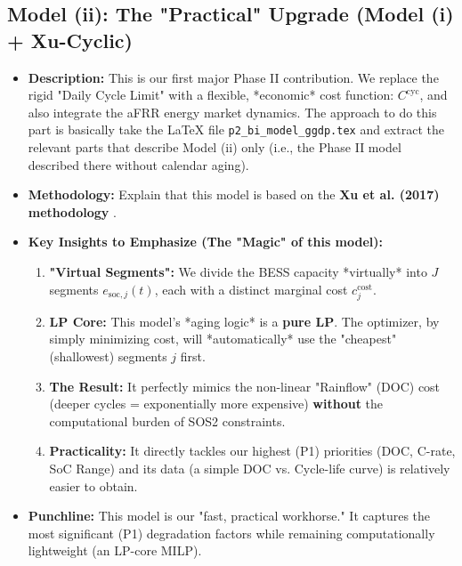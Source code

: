 \documentclass[11pt, a4paper]{article}
\begin{document}
\subsection{Model (ii): The "Practical" Upgrade (Model (i) + Xu-Cyclic)}
\begin{itemize}
    \item \textbf{Description:} This is our first major Phase II contribution. We replace the rigid "Daily Cycle Limit" with a flexible, *economic* cost function: $C^{\mathrm{cyc}}$, and also integrate the aFRR energy market dynamics. The approach to do this part is basically take the LaTeX file \texttt{p2\_bi\_model\_ggdp.tex} and extract the relevant parts that describe Model (ii) only (i.e., the Phase II model described there without calendar aging).
    
    \item \textbf{Methodology:} Explain that this model is based on the \textbf{Xu et al. (2017) methodology} \cite{xu2017}.
    \item \textbf{Key Insights to Emphasize (The "Magic" of this model):}
    \begin{enumerate}
        \item \textbf{"Virtual Segments":} We divide the BESS capacity *virtually* into $J$ segments $e_{\mathrm{soc},j}(t)$, each with a distinct marginal cost $c^{\mathrm{cost}}_{j}$.
        \item \textbf{LP Core:} This model's *aging logic* is a \textbf{pure LP}. The optimizer, by simply minimizing cost, will *automatically* use the "cheapest" (shallowest) segments $j$ first.
        \item \textbf{The Result:} It perfectly mimics the non-linear "Rainflow" (DOC) cost (deeper cycles = exponentially more expensive) \textbf{without} the computational burden of SOS2 constraints.
        \item \textbf{Practicality:} It directly tackles our highest (P1) priorities (DOC, C-rate, SoC Range) and its data (a simple DOC vs. Cycle-life curve) is relatively easier to obtain.
    \end{enumerate}
    \item \textbf{Punchline:} This model is our "fast, practical workhorse." It captures the most significant (P1) degradation factors while remaining computationally lightweight (an LP-core MILP).
\end{itemize}
\end{document}
